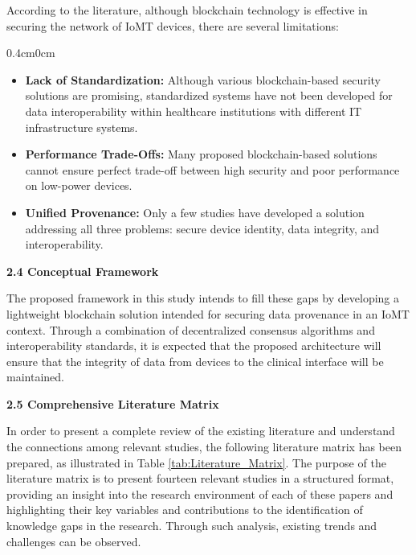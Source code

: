 \documentclass[12pt, a4paper]{report}
\begin{document}
\noindent According to the literature, although blockchain technology is effective in securing the network of IoMT devices, there are several limitations:
\begin{adjustwidth} {0.4cm}{0cm}
    \vspace{-1.0em}
\begin{itemize}[nosep, topsep=0pt, partopsep=0pt]
    \item \textbf{Lack of Standardization:} Although various blockchain-based security solutions are promising, standardized systems have not been developed for data interoperability within healthcare institutions with different IT infrastructure systems.
    \item \textbf{Performance Trade-Offs:} Many proposed blockchain-based solutions cannot ensure perfect trade-off between high security and poor performance on low-power devices.
    \item \textbf{Unified Provenance:} Only a few studies have developed a solution addressing all three problems: secure device identity, data integrity, and interoperability.
\end{itemize}
\end{adjustwidth}


\vspace{0.5cm}
{\color{myblue} \Large \bfseries 2.4	Conceptual Framework}

\noindent The proposed framework in this study intends to fill these gaps by developing a lightweight blockchain solution intended for securing data provenance in an IoMT context. Through a combination of decentralized consensus algorithms and interoperability standards, it is expected that the proposed architecture will ensure that the integrity of data from devices to the clinical interface will be maintained.


\vspace{0.5cm}
{\color{myblue} \Large \bfseries 2.5	Comprehensive Literature Matrix}

\noindent In order to present a complete review of the existing literature and understand the connections among relevant studies, the following literature matrix has been prepared, as illustrated in Table \ref{tab:Literature_Matrix}. The purpose of the literature matrix is to present fourteen relevant studies in a structured format, providing an insight into the research environment of each of these papers and highlighting their key variables and contributions to the identification of knowledge gaps in the research. Through such analysis, existing trends and challenges can be observed.
\vspace{0.3cm}
\end{document}
